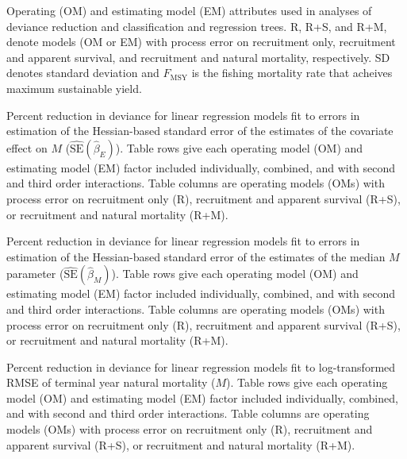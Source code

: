 \documentclass[
  12pt,
]{article}
\newcommand{\Fmsy}{\ensuremath{F_{\text{MSY}}}\xspace}
\begin{document}
\begin{table}
\caption{Operating (OM) and estimating model (EM) attributes used in analyses of deviance reduction and classification and regression trees. R, R+S, and R+M, denote models (OM or EM) with process error on recruitment only, recruitment and apparent survival, and recruitment and natural mortality, respectively. SD denotes standard deviation and \Fmsy is the fishing mortality rate that acheives maximum sustainable yield.}\label{factor_table}
{}
\end{table}
\pagebreak
\clearpage

\begin{table}
\caption{Percent reduction in deviance for linear regression models fit to errors in estimation of the Hessian-based standard error of the estimates of the covariate effect on $M$ ($\widehat {\text{SE}}\left(\widehat \beta_E\right)$). Table rows give each operating model (OM) and estimating model (EM) factor included individually, combined, and with second and third order interactions. Table columns are operating models (OMs) with process error on recruitment only (R), recruitment and apparent survival (R+S), or recruitment and natural mortality (R+M).}\label{bias_ecov_beta_se_PRD_table}
{}
\end{table}
\pagebreak

\begin{table}
\caption{Percent reduction in deviance for linear regression models fit to errors in estimation of the Hessian-based standard error of the estimates of the median $M$ parameter ($\widehat {\text{SE}}\left(\widehat \beta_M\right)$). Table rows give each operating model (OM) and estimating model (EM) factor included individually, combined, and with second and third order interactions. Table columns are operating models (OMs) with process error on recruitment only (R), recruitment and apparent survival (R+S), or recruitment and natural mortality (R+M).}\label{median_M_se_bias_PRD_table}
{}
\end{table}
\pagebreak

\begin{table}
\caption{Percent reduction in deviance for linear regression models fit to log-transformed RMSE of terminal year natural mortality ($M$). Table rows give each operating model (OM) and estimating model (EM) factor included individually, combined, and with second and third order interactions. Table columns are operating models (OMs) with process error on recruitment only (R), recruitment and apparent survival (R+S), or recruitment and natural mortality (R+M).}\label{rmse_M_PRD_table}
{}
\end{table}
\pagebreak
\end{document}
